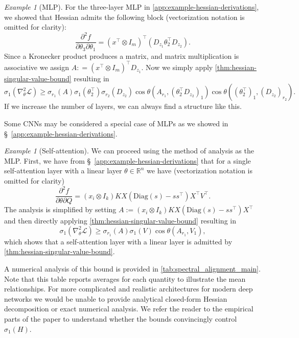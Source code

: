\documentclass{article}
\newcommand{\prinangle}{\cos\theta}
\theoremstyle{plain}
\theoremstyle{definition}
\theoremstyle{remark}
\newtheorem{example}[theorem]{Example}
\begin{document}
\begin{example}[MLP]
\label{example:mlp}
For the three-layer MLP in \cref{app:example-hessian-derivations}, we showed that Hessian admits the following block (vectorization notation is omitted for clarity):
\[
\frac{\partial^2 f}{\partial \theta_3 \partial \theta_1} =
(x^{\top} \otimes I_{m})^{\top} (D_{z_1} \theta_2^{\top}    D_{z_2}).
\]
Since a Kronecker product produces a matrix, and matrix multiplication is associative we assign $A: = (x^{\top} \otimes I_{m})^{\top}D_{z_1}$. Now we simply apply \cref{thm:hessian-singular-value-bound} resulting in \[
\sigma_1(\nabla^2_{\theta}\mathcal{L} ) \geq
\sigma_{r_1}(A)\sigma_1(\theta_2^{\top}) \sigma_{r_2}(D_{z_2})\prinangle(A_{r_1}, (\theta_2^{\top} D_{z_2})_1) \prinangle((\theta_2^{\top})_1, (D_{z_2})_{r_2}).
\]
If we increase the number of layers, we can always find a structure like this.
\end{example}

Some CNNs may be considered a special case of MLPs as we showed in \S~\ref{app:example-hessian-derivations}.

\begin{example}[Self-attention]
\label{example:self-attention}
We can proceed using the method of analysis as the MLP. First, we have from \S~\ref{app:example-hessian-derivations} that for a single self-attention layer with a linear layer $\theta \in \mathbb{R}^n$ we have (vectorization notation is omitted for clarity)  \[
\frac{\partial^2 f}{\partial \theta \partial Q} =  (x_i \otimes I_k) KX
\left(\mathrm{Diag}(s) - ss^\top \right)
 X^\top V^{\top}.
\] The analysis is simplified by setting $A := (x_i \otimes I_k) KX
\left(\mathrm{Diag}(s) - ss^\top \right)X^{\top}$ and then directly applying \cref{thm:hessian-singular-value-bound} resulting in \[
\sigma_1(\nabla^2_{\theta}\mathcal{L}) \geq
\sigma_{r_1}(A)\sigma_1(V) \prinangle(A_{r_1}, V_1),
\] which shows that a self-attention layer with a linear layer is admitted by \cref{thm:hessian-singular-value-bound}.
\end{example}

A numerical analysis of this bound is provided in \cref{tab:spectral_alignment_main}. Note that this table reports averages for each quantity to illustrate the mean relationships. For more complicated and realistic architectures for modern deep networks we would be unable to provide analytical closed-form Hessian decomposition or exact numerical analysis. We refer the reader to the empirical parts of the paper to understand whether the bounds convincingly control $\sigma_1(H)$.
\end{document}
